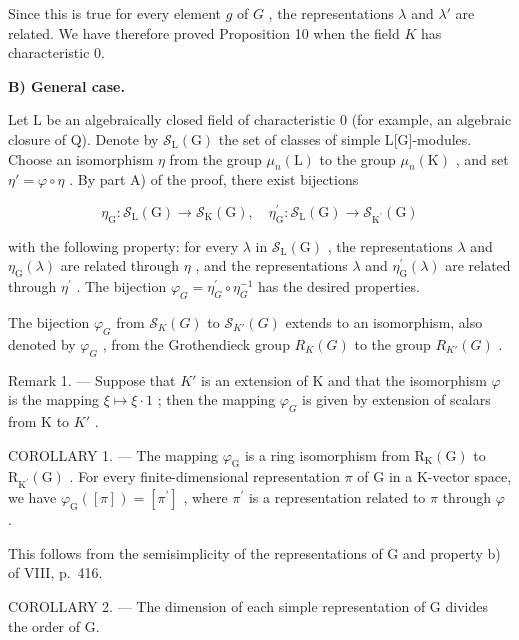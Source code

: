 Since this is true for every element \(g\) of \(G\) , the representations \(\lambda\) and \(\lambda'\) are related. We have therefore proved Proposition 10 when the field \(K\) has characteristic 0.

\textbf{B) General case.}

Let L be an algebraically closed field of characteristic 0 (for example, an algebraic closure of Q). Denote by \(\mathcal{S}_{\mathrm{L}}(\mathrm{G})\) the set of classes of simple L{[}G{]}-modules. Choose an isomorphism \(\eta\) from the group \(\mu_{n}(\mathrm{L})\) to the group \(\mu_{n}(\mathrm{K})\) , and set \(\eta' = \varphi \circ \eta\) . By part A) of the proof, there exist bijections

\[
\eta_ {\mathrm{G}}: \mathcal {S} _ {\mathrm{L}} (\mathrm{G}) \to \mathcal {S} _ {\mathrm{K}} (\mathrm{G}), \quad \eta_ {\mathrm{G}} ^ {\prime}: \mathcal {S} _ {\mathrm{L}} (\mathrm{G}) \to \mathcal {S} _ {\mathrm {K^ {\prime}}} (\mathrm{G})
\]

with the following property: for every \(\lambda\) in \(\mathcal{S}_{\mathrm{L}}(\mathrm{G})\) , the representations \(\lambda\) and \(\eta_{\mathrm{G}}(\lambda)\) are related through \(\eta\) , and the representations \(\lambda\) and \(\eta_{\mathrm{G}}^{\prime}(\lambda)\) are related through \(\eta^{\prime}\) . The bijection \(\varphi_{G} = \eta_{G}^{\prime} \circ \eta_{G}^{-1}\) has the desired properties.

The bijection \(\varphi_{G}\) from \(\mathcal{S}_{K}(G)\) to \(\mathcal{S}_{K'}(G)\) extends to an isomorphism, also denoted by \(\varphi_{G}\) , from the Grothendieck group \(R_{K}(G)\) to the group \(R_{K'}(G)\) .

Remark 1. --- Suppose that \(K'\) is an extension of K and that the isomorphism \(\varphi\) is the mapping \(\xi \mapsto \xi \cdot 1\) ; then the mapping \(\varphi_{G}\) is given by extension of scalars from K to \(K'\) .

COROLLARY 1. --- The mapping \(\varphi_{\mathrm{G}}\) is a ring isomorphism from \(\mathrm{R}_{\mathrm{K}}(\mathrm{G})\) to \(\mathrm{R}_{\mathrm{K}^{\prime}}(\mathrm{G})\) . For every finite-dimensional representation \(\pi\) of \(\mathrm{G}\) in a K-vector space, we have \(\varphi_{\mathrm{G}}([\pi]) = [\pi^{\prime}]\) , where \(\pi^{\prime}\) is a representation related to \(\pi\) through \(\varphi\) .

This follows from the semisimplicity of the representations of G and property b) of VIII, p.~416.

COROLLARY 2. --- The dimension of each simple representation of G divides the order of G.


